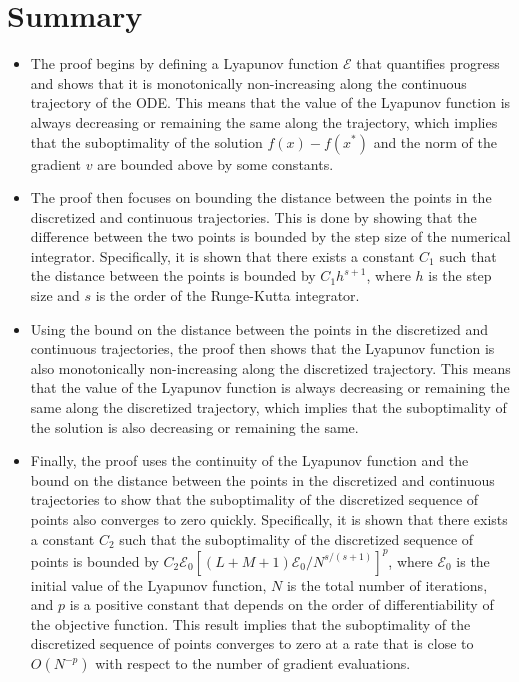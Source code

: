

\section{Summary} 
\begin{itemize}
    \item The proof begins by defining a Lyapunov function $\mathcal{E}$ that quantifies progress and shows that it is monotonically non-increasing along the continuous trajectory of the ODE. This means that the value of the Lyapunov function is always decreasing or remaining the same along the trajectory, which implies that the suboptimality of the solution $f(x) - f(x^*)$ and the norm of the gradient $v$ are bounded above by some constants.

    \item The proof then focuses on bounding the distance between the points in the discretized and continuous trajectories. This is done by showing that the difference between the two points is bounded by the step size of the numerical integrator. Specifically, it is shown that there exists a constant $C_1$ such that the distance between the points is bounded by $C_1 h^{s+1}$, where $h$ is the step size and $s$ is the order of the Runge-Kutta integrator.

    \item Using the bound on the distance between the points in the discretized and continuous trajectories, the proof then shows that the Lyapunov function is also monotonically non-increasing along the discretized trajectory. This means that the value of the Lyapunov function is always decreasing or remaining the same along the discretized trajectory, which implies that the suboptimality of the solution is also decreasing or remaining the same.

    \item Finally, the proof uses the continuity of the Lyapunov function and the bound on the distance between the points in the discretized and continuous trajectories to show that the suboptimality of the discretized sequence of points also converges to zero quickly. Specifically, it is shown that there exists a constant $C_2$ such that the suboptimality of the discretized sequence of points is bounded by $C_2 \mathcal{E}_0 [(L+M+1)\mathcal{E}_0/N^{s/(s+1)}]^p$, where $\mathcal{E}_0$ is the initial value of the Lyapunov function, $N$ is the total number of iterations, and $p$ is a positive constant that depends on the order of differentiability of the objective function. This result implies that the suboptimality of the discretized sequence of points converges to zero at a rate that is close to $O(N^{-p})$ with respect to the number of gradient evaluations.
\end{itemize}
\newpage
